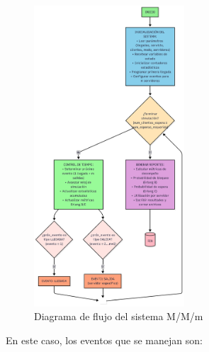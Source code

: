 \documentclass{article}
\begin{document}
\begin{figure}[H]
    \centering
    \includegraphics[width=0.5\textwidth]{images/flujos/ErlangFujo.png}
    \caption{Diagrama de flujo del sistema M/M/m}
    \label{fig:mm_m_flujo}
\end{figure}

En este caso, los eventos que se manejan son:
\end{document}
